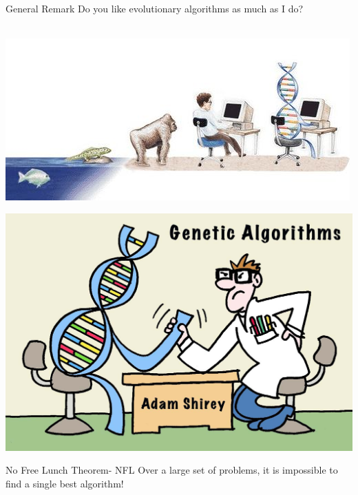 \begin{frame}{General Remark}
Do you like evolutionary algorithms as much as I do? \hands \\~\\
\begin{minipage}[c]{0.49\textwidth}
\includegraphics[width=\textwidth]{new_images/end2.jpg}
\end{minipage}
\begin{minipage}[c]{0.49\textwidth}
\includegraphics[width=\textwidth]{new_images/end1.jpg} 
\end{minipage}

\begin{block}{No Free Lunch Theorem- NFL}
Over a large set of  problems, it is impossible to find a single best algorithm!
\end{block}
\end{frame}

